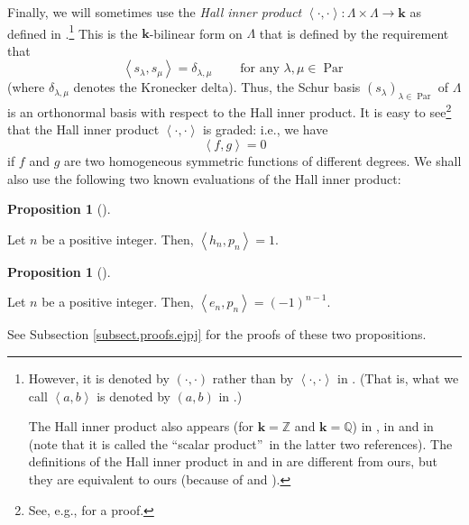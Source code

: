 \documentclass[numbers=enddot,12pt,final,onecolumn,notitlepage]{scrartcl}%
\theoremstyle{definition}
\newtheorem{prop}[theo]{Proposition}
\newenvironment{proposition}[1][]
{\begin{prop}[#1]\begin{leftbar}}
{\end{leftbar}\end{prop}}
\begin{document}
Finally, we will sometimes use the \emph{Hall inner product} $\left\langle
\cdot,\cdot\right\rangle :\Lambda\times\Lambda\rightarrow\mathbf{k}$ as
defined in \cite[Definition 2.5.12]{GriRei}.\footnote{However, it is denoted
by $\left(  \cdot,\cdot\right)  $ rather than by $\left\langle \cdot
,\cdot\right\rangle $ in \cite{GriRei}. (That is, what we call $\left\langle
a,b\right\rangle $ is denoted by $\left(  a,b\right)  $ in \cite{GriRei}.)
\par
The Hall inner product also appears (for $\mathbf{k}=\mathbb{Z}$ and
$\mathbf{k}=\mathbb{Q}$) in \cite[Definition 7.5]{Egge19}, in \cite[\S 7.9]%
{Stanley-EC2} and in \cite[Section I.4]{Macdon95} (note that it is called the
\textquotedblleft scalar product\textquotedblright\ in the latter two
references). The definitions of the Hall inner product in \cite[\S 7.9]%
{Stanley-EC2} and in \cite[Section I.4]{Macdon95} are different from ours, but
they are equivalent to ours (because of \cite[Corollary 7.12.2]{Stanley-EC2}
and \cite[Chapter I, (4.8)]{Macdon95}).} This is the $\mathbf{k}$-bilinear
form on $\Lambda$ that is defined by the requirement that
\[
\left\langle s_{\lambda},s_{\mu}\right\rangle =\delta_{\lambda,\mu
}\ \ \ \ \ \ \ \ \ \ \text{for any }\lambda,\mu\in\operatorname*{Par}%
\]
(where $\delta_{\lambda,\mu}$ denotes the Kronecker delta). Thus, the Schur
basis $\left(  s_{\lambda}\right)  _{\lambda\in\operatorname*{Par}}$ of
$\Lambda$ is an orthonormal basis with respect to the Hall inner product. It
is easy to see\footnote{See, e.g., \cite[Exercise 2.5.13(a)]{GriRei} for a
proof.} that the Hall inner product $\left\langle \cdot,\cdot\right\rangle $
is graded: i.e., we have%
\begin{equation}
\left\langle f,g\right\rangle =0 \label{eq.Hall.graded}%
\end{equation}
if $f$ and $g$ are two homogeneous symmetric functions of different degrees.
We shall also use the following two known evaluations of the Hall inner product:

\begin{proposition}
\label{prop.hjpj}Let $n$ be a positive integer. Then, $\left\langle
h_{n},p_{n}\right\rangle =1$.
\end{proposition}

\begin{proposition}
\label{prop.ejpj}Let $n$ be a positive integer. Then, $\left\langle
e_{n},p_{n}\right\rangle =\left(  -1\right)  ^{n-1}$.
\end{proposition}

See Subsection \ref{subsect.proofs.ejpj} for the proofs of these two propositions.
\end{document}
